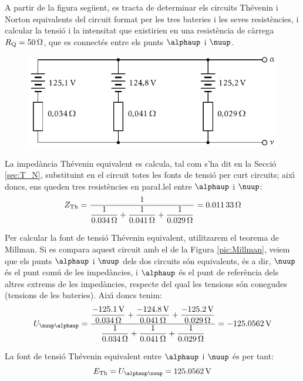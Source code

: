 \begin{exemple}
A partir de la figura seg\"{u}ent, es tracta de determinar els circuits
Th\'{e}venin i Norton equivalents del circuit format per les tres
bateries i les seves resist\`{e}ncies, i calcular la tensi\'{o} i la
intensitat que existirien en una resist\`{e}ncia de c\`{a}rrega
$R_\mathrm{Q}=\SI{50}{\ensuremath{\mathrm{\Omega}}}$, que es connect\'{e}s entre els punts $\alphaup$
i $\nuup$.

\begin{figure}[htb]
    \centering
    \includegraphics{Imatges/Cap-Fonaments-Millman-Exemple1.pdf}
\end{figure}

La imped\`{a}ncia Th\'{e}venin equivalent es calcula, tal com s'ha dit en la Secci\'{o} \ref{sec:T_N},
substituint en el circuit totes les fonts de tensi\'{o} per curt circuits; aix\'{\i} doncs, ens
queden tres resist\`{e}ncies en para{\l.l}el entre $\alphaup$ i $\nuup$:
\[
Z_\mathrm{Th} = \frac{1}{\dfrac{1}{\SI{0,034}{\ensuremath{\mathrm{\Omega}}}} +
\dfrac{1}{\SI{0,041}{\ensuremath{\mathrm{\Omega}}}} + \dfrac{1}{\SI{0,029}{\ensuremath{\mathrm{\Omega}}}}} =
\SI{0,01133}{\ensuremath{\mathrm{\Omega}}}
\]

Per calcular la font de tensi\'{o} Th\'{e}venin equivalent, utilitzarem el
teorema de Millman. Si es compara aquest circuit amb el de la Figura
\vref{pic:Millman}, veiem que els punts $\alphaup$ i $\nuup$ dels dos
circuits s\'{o}n equivalents, \'{e}s a dir, $\nuup$ \'{e}s el punt com\'{u} de les
imped\`{a}ncies, i $\alphaup$ \'{e}s el punt de refer\`{e}ncia dels altres extrems
de les imped\`{a}ncies, respecte del qual les tensions s\'{o}n conegudes
(tensions de les bateries). Aix\'{\i} doncs tenim:
\[
U_{\nuup\alphaup} = \frac{\dfrac{\SI{-125,1}{V}}{\SI{0,034}{\ohm}} +
\dfrac{\SI{-124,8}{V}}{\SI{0,041}{\ohm}} +
\dfrac{\SI{-125,2}{V}}{\SI{0,029}{\ohm}}}{\dfrac{1}{\SI{0,034}{\ohm}}
+ \dfrac{1}{\SI{0,041}{\ohm}} + \dfrac{1}{\SI{0,029}{\ohm}}} =
\SI{-125,0562}{V}
\]

La font de tensi\'{o}  Th\'{e}venin equivalent entre $\alphaup$ i $\nuup$ \'{e}s per
tant:
\[
E\ped{Th} = U_{\alphaup\nuup} = \SI{125,0562}{V}
\]


\end{exemple}
